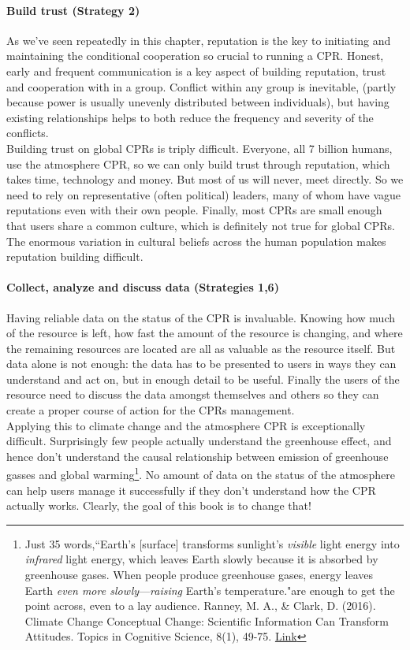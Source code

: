 \paragraph{Build trust (Strategy 2)}
As we've seen repeatedly in this chapter, reputation is the key to initiating and maintaining the conditional cooperation so crucial to running a CPR. Honest, early and frequent communication is a key aspect of building reputation, trust and cooperation with in a group. Conflict within any group is inevitable, (partly because power is usually unevenly distributed between individuals), but having existing relationships helps to both reduce the frequency and severity of the conflicts.\\

Building trust on global CPRs is triply difficult. Everyone, all 7 billion humans, use the atmosphere CPR, so we can only build trust through reputation, which takes time, technology and money. But most of us will never, meet directly. So we need to rely on representative (often political) leaders, many of whom have vague reputations even with their own people. Finally, most CPRs are small enough that users share a common culture, which is definitely not true for global CPRs. The enormous variation in cultural beliefs across the human population makes reputation building difficult.   

\paragraph{Collect, analyze and discuss data (Strategies 1,6)}
Having reliable data on the status of the CPR is invaluable. Knowing how much of the resource is left, how fast the amount of the resource is changing, and where the remaining resources are located are all as valuable as the resource itself. But data alone is not enough: the data has to be presented to users in ways they can understand and act on, but in enough detail to be useful. Finally the users of the resource need to discuss the data amongst themselves and others so they can create a proper course of action for the CPRs management.\\

Applying this to climate change and the atmosphere CPR is exceptionally difficult. Surprisingly few people actually understand the greenhouse effect, and hence don't understand the causal relationship between emission of greenhouse gasses and global warming\footnote{Just 35 words,``Earth's [surface] transforms sunlight's \emph{visible} light energy into \emph{infrared} light energy, which leaves Earth slowly because it is absorbed by greenhouse gases. When people produce greenhouse gases, energy leaves Earth \emph{even more slowly}---\emph{raising} Earth's temperature."are enough to  get the point across, even to a lay audience. Ranney, M. A., \& Clark, D. (2016). Climate Change Conceptual Change: Scientific Information Can Transform Attitudes. Topics in Cognitive Science, 8(1), 49-75. \href{https://doi.org/10.1111/tops.12187}{Link}}. No amount of data on the status of the atmosphere can help users manage it successfully if they don't understand how the CPR actually works. Clearly, the goal of this book is to change that!   


